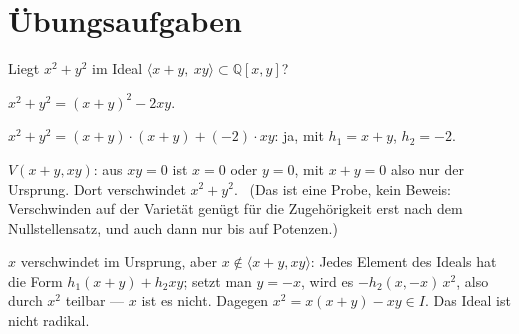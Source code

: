 \section{Übungsaufgaben}

\begin{aufgabe}
Liegt $x^{2} + y^{2}$ im Ideal $\langle x + y,\ xy\rangle\subset\mathbb Q[x, y]$?

\loesung
{}
$x^{2} + y^{2} = (x + y)^{2} - 2xy$.

$x^{2} + y^{2} = (x + y)\cdot(x + y) + (-2)\cdot xy$: ja, mit $h_1 = x + y$, $h_2 = -2$.

$V(x + y, xy)$: aus $xy = 0$ ist $x = 0$ oder $y = 0$, mit $x + y = 0$ also nur der Ursprung. Dort verschwindet $x^{2} + y^{2}$. \checkmark\ (Das ist eine Probe, kein Beweis: Verschwinden auf der Varietät genügt für die Zugehörigkeit erst nach dem Nullstellensatz, und auch dann nur bis auf Potenzen.)

$x$ verschwindet im Ursprung, aber $x\notin\langle x + y, xy\rangle$: Jedes Element des Ideals hat die Form $h_1(x + y) + h_2xy$; setzt man $y = -x$, wird es $-h_2(x, -x)\,x^{2}$, also durch $x^{2}$ teilbar --- $x$ ist es nicht. Dagegen $x^{2} = x(x + y) - xy\in I$. Das Ideal ist nicht radikal.

\begin{center}
\begin{minipage}{0.88\textwidth}
\end{minipage}
\end{center}
\end{aufgabe}

